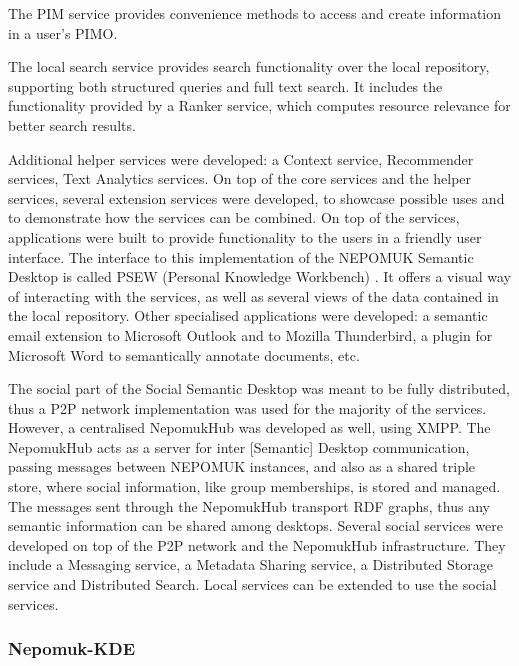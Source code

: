 The PIM service provides convenience methods to access and create information in a user's PIMO. 

The local search service provides search functionality over the local repository, supporting both structured queries and full text search. It includes the functionality provided by a Ranker service, which computes resource relevance for better search results. 

Additional helper services were developed: a Context service, Recommender services, Text Analytics services. 
On top of the core services and the helper services, several extension services were developed, to showcase possible uses and to demonstrate how the services can be combined. 
On top of the services, applications were built to provide functionality to the users in a friendly user interface. The interface to this implementation of the NEPOMUK Semantic Desktop is called PSEW (Personal Knowledge Workbench) \cite{Grimnes2009}. It offers a visual way of interacting with the services, as well as several views of the data contained in the local repository. Other specialised applications were developed: a semantic email extension \cite{Scerri2009} to Microsoft Outlook and to Mozilla Thunderbird, a plugin for Microsoft Word \cite{Groza2011} to semantically annotate documents, etc.

The social part of the Social Semantic Desktop was meant to be fully distributed, thus a P2P network implementation was used for the majority of the services. However, a centralised NepomukHub was developed as well, using XMPP. The NepomukHub acts as a server for inter [Semantic] Desktop communication, passing messages between NEPOMUK instances, and also as a shared triple store, where social information, like group memberships, is stored and managed. The messages sent through the NepomukHub transport RDF graphs, thus any semantic information can be shared among desktops. Several social services were developed on top of the P2P network and the NepomukHub infrastructure. They include a Messaging service, a Metadata Sharing service, a Distributed Storage service and Distributed Search. Local services can be extended to use the social services.

\subsubsection{Nepomuk-KDE}

